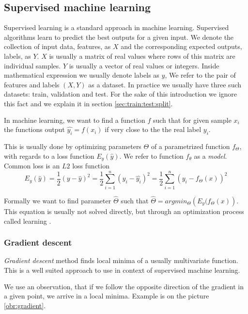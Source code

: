     \subsection{Supervised machine learning}
    
    Supervised learning is a standard approach in machine learning. 
    Supervised algorithms learn to predict the best outputs for a given input.
    We denote the collection of input data, features, as $X$ and the corresponding expected outputs, labels, as $Y$.
    $X$ is usually a matrix of real values where rows of this matrix are individual samples.
    $Y$ is usually a vector of real values or integers. 
    Inside mathematical expression we usually denote labels as $y$,
    We refer to the pair of features and labels $(X, Y)$ as a dataset.
    In practice we usually have three such datasets: train, validation and test. 
    For the sake of this introduction we ignore this fact and we explain it in section \ref{sec:train:test:split}.
    
    In machine learning, we want to find a function $f$ such that for given sample $x_i$
    the functions output $\hat{y_i} = f(x_i)$ if very close to the the real label $y_i$.
    
    This is usually done by optimizing parameters $\Theta$ of a parametrized function $f_\Theta$,
    with regards to a loss function $E_y(\hat{y})$. 
    We refer to function $f_\theta$ as a \textit{model}.
    Common loss is an $L2$ loss function 
    $$E_y(\hat{y}) = \frac{1}{2}(y - \hat{y})^2 = \frac{1}{2}\sum_{i=1}^n (y_i - \hat{y_i})^2= \frac{1}{2}\sum_{i=1}^n (y_i - f_\Theta(x))^2$$  
    
    Formally we want to find parameter $\hat{\Theta}$ such that $\hat{\Theta} = argmin_\Theta \left(E_y(f_\Theta(x) \right)$. 
    This equation is usually not solved directly, but through an optimization process called learning \cite{Goodfellow-et-al-2016}. %
    
    \subsubsection{Gradient descent}

    \textit{Gradient descent} method finds local minima of a usually multivariate function. 
    This is a well suited approach to use in context of supervised machine learning. 
    
    We use an observation, that if we follow the opposite direction of the gradient in a given point, 
    we arrive in a local minima. Example is on the picture \ref{obr:gradient}.
    
